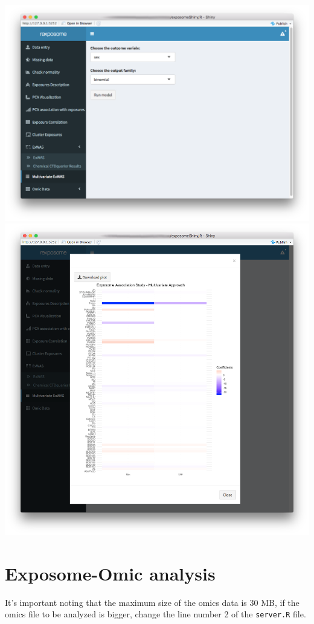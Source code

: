 \documentclass[
]{book}
\begin{document}
\includegraphics{images/analysis8_2.png}
\includegraphics{images/analysis8_3.png}

\hypertarget{exposome-omic-analysis}{%
\section{Exposome-Omic analysis}\label{exposome-omic-analysis}}

It's important noting that the maximum size of the omics data is 30 MB, if the omics file to be analyzed is bigger, change the line number 2 of the \texttt{server.R} file.
\end{document}

